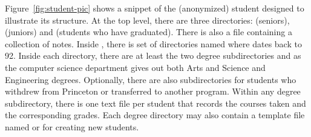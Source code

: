 Figure~\ref{fig:student-pic} shows a snippet
of the (anonymized) student \filestore{} designed to
illustrate its structure.  At the top level, there are
three directories: 
 (seniors),
 (juniors)
and 
 (students who have graduated).
There is also a  file containing a collection of notes.
Inside , there is set of directories named 
 where  dates back to 92.  Inside each  
directory, there are at least the 
two degree subdirectories  and  as
the computer science department gives out both Arts and Science
and Engineering degrees.  Optionally, there are also subdirectories for
students who withdrew from Princeton or transferred to another program. 
Within any degree subdirectory, there is one text file
per student that records the courses taken and the corresponding grades.
Each degree directory may also contain a 
template file named  or  for creating
new students.



